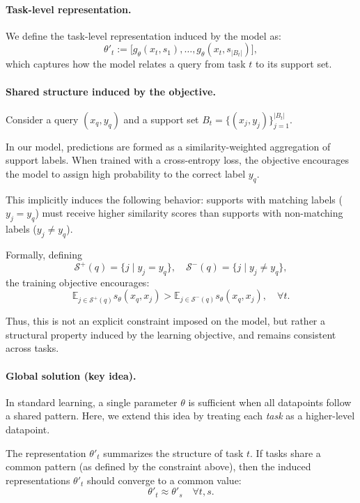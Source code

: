 \documentclass{article}
\begin{document}
\paragraph{Task-level representation.}
We define the task-level representation induced by the model as:
\begin{equation}
\theta'_t := \big[g_\theta(x_t, s_1), \dots, g_\theta(x_t, s_{|B_t|})\big],
\end{equation}
which captures how the model relates a query from task $t$ to its support set.

\paragraph{Shared structure induced by the objective.}
Consider a query $(x_q, y_q)$ and a support set 
$B_t = \{(x_j, y_j)\}_{j=1}^{|B_t|}$.

In our model, predictions are formed as a similarity-weighted aggregation of support labels. When trained with a cross-entropy loss, the objective encourages the model to assign high probability to the correct label $y_q$.

This implicitly induces the following behavior: supports with matching labels ($y_j = y_q$) must receive higher similarity scores than supports with non-matching labels ($y_j \neq y_q$). 

Formally, defining
\[
\mathcal{S}^+(q)=\{j \mid y_j = y_q\}, \quad
\mathcal{S}^-(q)=\{j \mid y_j \neq y_q\},
\]
the training objective encourages:
\begin{equation}
\mathbb{E}_{j \in \mathcal{S}^+(q)} s_\theta(x_q, x_j)
>
\mathbb{E}_{j \in \mathcal{S}^-(q)} s_\theta(x_q, x_j), \quad \forall t.
\end{equation}

Thus, this is not an explicit constraint imposed on the model, but rather a structural property induced by the learning objective, and remains consistent across tasks.

\paragraph{Global solution (key idea).}
In standard learning, a single parameter $\theta$ is sufficient when all datapoints follow a shared pattern. 
Here, we extend this idea by treating each \emph{task} as a higher-level datapoint.

The representation $\theta'_t$ summarizes the structure of task $t$. 
If tasks share a common pattern (as defined by the constraint above), then the induced representations $\theta'_t$ should converge to a common value:
\begin{equation}
\theta'_t \approx \theta'_s \quad \forall t,s.
\end{equation}
\end{document}

